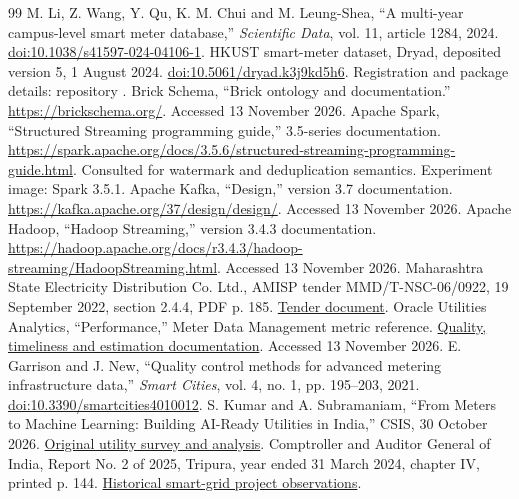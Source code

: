 \documentclass[11pt,a4paper]{article}
\begin{document}
\FloatBarrier
\begin{thebibliography}{99}\small
{} M. Li, Z. Wang, Y. Qu, K. M. Chui and M. Leung-Shea, ``A multi-year campus-level smart meter database,'' \emph{Scientific Data}, vol. 11, article 1284, 2024. \href{https://doi.org/10.1038/s41597-024-04106-1}{doi:10.1038/s41597-024-04106-1}.
 HKUST smart-meter dataset, Dryad, deposited version 5, 1 August 2024. \href{https://doi.org/10.5061/dryad.k3j9kd5h6}{doi:10.5061/dryad.k3j9kd5h6}. Registration and package details: repository .
 Brick Schema, ``Brick ontology and documentation.'' \url{https://brickschema.org/}. Accessed 13 November 2026.
 Apache Spark, ``Structured Streaming programming guide,'' 3.5-series documentation. \url{https://spark.apache.org/docs/3.5.6/structured-streaming-programming-guide.html}. Consulted for watermark and deduplication semantics. Experiment image: Spark 3.5.1.
 Apache Kafka, ``Design,'' version 3.7 documentation. \url{https://kafka.apache.org/37/design/design/}. Accessed 13 November 2026.
 Apache Hadoop, ``Hadoop Streaming,'' version 3.4.3 documentation. \url{https://hadoop.apache.org/docs/r3.4.3/hadoop-streaming/HadoopStreaming.html}. Accessed 13 November 2026.
 Maharashtra State Electricity Distribution Co. Ltd., AMISP tender MMD/T-NSC-06/0922, 19 September 2022, section 2.4.4, PDF p. 185. \href{https://www.mahadiscom.in/supplier/wp-content/uploads/2022/09/FILE_MMD_T-NSC-06_0922_version_1_1663594929641-Package-1.pdf}{Tender document}.
 Oracle Utilities Analytics, ``Performance,'' Meter Data Management metric reference. \href{https://docs.oracle.com/en/industries/utilities/analytics/2.8.0.0/ouaw-mdm-metric/OUAW_MDM_Metric/MDM_BI_Content.2.6.html}{Quality, timeliness and estimation documentation}. Accessed 13 November 2026.
 E. Garrison and J. New, ``Quality control methods for advanced metering infrastructure data,'' \emph{Smart Cities}, vol. 4, no. 1, pp. 195--203, 2021. \href{https://doi.org/10.3390/smartcities4010012}{doi:10.3390/smartcities4010012}.
 S. Kumar and A. Subramaniam, ``From Meters to Machine Learning: Building AI-Ready Utilities in India,'' CSIS, 30 October 2026. \href{https://www.csis.org/analysis/meters-machine-learning-building-ai-ready-utilities-india}{Original utility survey and analysis}.
 Comptroller and Auditor General of India, Report No. 2 of 2025, Tripura, year ended 31 March 2024, chapter IV, printed p. 144. \href{https://cag.gov.in/uploads/download_audit_report/2025/6--Chapter-4-069ccbc5e407049.02992125.pdf}{Historical smart-grid project observations}.
\end{thebibliography}
\end{document}
